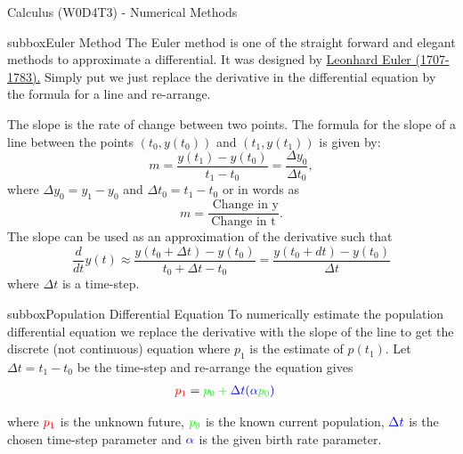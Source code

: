 \begin{textbox}{Calculus (W0D4T3) - Numerical Methods}
\begin{subbox}{subbox}{Euler Method}
\scriptsize
The Euler method is one of the straight forward and elegant methods to approximate a differential. It was designed by \href{https://en.wikipedia.org/wiki/Leonhard_Euler}{Leonhard Euler (1707-1783).} 
Simply put we just replace the derivative in the differential equation by the formula for a line and re-arrange.

The slope is the rate of change between two points. The formula for the slope of a line between the points $(t_0,y(t_0))$ and $(t_1,y(t_1))$ is given by:
$$ m=\frac{y(t_1)-y(t_0)}{t_1-t_0}=\frac{\Delta y_0}{\Delta t_0}, $$
where $\Delta y_0=y_1-y_0$ and $\Delta t_0=t_1-t_0$ or in words as
$$ m=\frac{\text{ Change in y} }{\text{Change in t}}. $$
The slope can be used as an approximation of the derivative such that
$$ \frac{d}{dt}y(t)\approx \frac{y(t_0+\Delta t)-y(t_0)}{t_0+\Delta t-t_0}=\frac{y(t_0+dt)-y(t_0)}{\Delta t}$$
where $\Delta t$ is a time-step.
\end{subbox}
\begin{subbox}{subbox}{Population Differential Equation}
\scriptsize
To numerically estimate the population differential equation we replace the derivative with the slope of the line to get the discrete (not continuous) equation where $p_1$ is the estimate of $p(t_1)$. Let $\Delta t=t_1-t_0$ be the time-step and re-arrange the equation gives
\begin{align*}
\color{red}{p_1}&=\color{green}{p_0}+\color{blue}{\Delta t} (\color{blue}{\alpha} \color{green}{p_0} \color{blue}{)}
\end{align*}

where $\color{red}{p_1}$ is the unknown future, $\color{green}{p_0}$ is the known current population, $\color{blue}{\Delta t}$ is the chosen time-step parameter and $\color{blue}{\alpha}$ is the given birth rate parameter.


\end{subbox}
\end{textbox}
